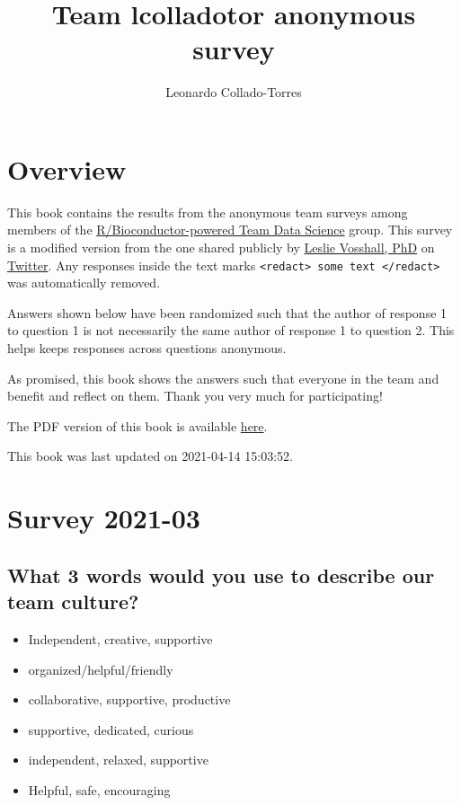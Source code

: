\documentclass[
]{book}
\title{Team lcolladotor anonymous survey}
\author{Leonardo Collado-Torres}
\date{}
\providecommand{\tightlist}{%
  \setlength{\itemsep}{0pt}\setlength{\parskip}{0pt}}
\begin{document}
\maketitle

{
\setcounter{tocdepth}{1}
\tableofcontents
}
\hypertarget{overview}{%
\chapter*{Overview}\label{overview}}

This book contains the results from the anonymous team surveys among members of the \href{https://lcolladotor.github.io/bioc_team_ds/}{R/Bioconductor-powered Team Data Science} group. This survey is a modified version from the one shared publicly by \href{https://twitter.com/leslievosshall}{Leslie Vosshall, PhD} on \href{https://twitter.com/leslievosshall/status/1371260850657460227?s=20}{Twitter}. Any responses inside the text marks \texttt{\textless{}redact\textgreater{}\ some\ text\ \textless{}/redact\textgreater{}} was automatically removed.

Answers shown below have been randomized such that the author of response 1 to question 1 is not necessarily the same author of response 1 to question 2. This helps keeps responses across questions anonymous.

As promised, this book shows the answers such that everyone in the team and benefit and reflect on them. Thank you very much for participating!

The PDF version of this book is available \href{_main.pdf}{here}.

This book was last updated on 2021-04-14 15:03:52.

\hypertarget{survey-2021-03}{%
\chapter{Survey 2021-03}\label{survey-2021-03}}

\hypertarget{what-3-words-would-you-use-to-describe-our-team-culture}{%
\section{What 3 words would you use to describe our team culture?}\label{what-3-words-would-you-use-to-describe-our-team-culture}}

\begin{itemize}
\tightlist
\item
  Independent, creative, supportive
\item
  organized/helpful/friendly
\item
  collaborative, supportive, productive
\item
  supportive, dedicated, curious
\item
  independent, relaxed, supportive
\item
  Helpful, safe, encouraging
\end{itemize}
\end{document}
